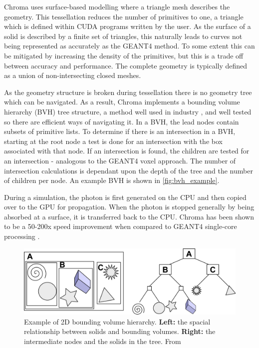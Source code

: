 Chroma uses surface-based modelling where a triangle mesh describes the geometry.
This tessellation reduces the number of primitives to one, a triangle which is defined within CUDA programs written by the user.
As the surface of a solid is described by a finite set of triangles, this naturally leads to curves not being represented as accurately as the GEANT4 method.
To some extent this can be mitigated by increasing the density of the primitives, but this is a trade off between accuracy and performance.
The complete geometry is typically defined as a union of non-intersecting closed meshes.
\par
As the geometry structure is broken during tessellation there is no geometry tree which can be navigated.
As a result, Chroma implements a bounding volume hierarchy (BVH) tree structure, a method well used in industry \cite{real_time_collision_detection_ref}, and well tested so there are efficient ways of navigating it.
In a BVH, the lead nodes contain subsets of primitive lists.
To determine if there is an intersection in a BVH, starting at the root node a test is done for an intersection with the box associated with that node.
If an intersection is found, the children are tested for an intersection - analogous to the GEANT4 voxel approach.
The number of intersection calculations is dependant upon the depth of the tree and the number of children per node.
An example BVH is shown in \autoref{fig:bvh_example}.
\par
During a simulation, the photon is first generated on the CPU and then copied over to the GPU for propagation.
When the photon is stopped generally by being absorbed at a surface, it is transferred back to the CPU.
Chroma has been shown to be a 50-200x speed improvement when compared to GEANT4 single-core processing \cite{chroma_whitepaper_ref,chroma_presentation_ref}.
\begin{figure}
    \centering
    \includegraphics[width=\textwidth]{Figures/Simulations/bounding_volume_hierarchy.png}
    \caption{Example of 2D bounding volume hierarchy. 
             \textbf{Left:} the spacial relationship between solids and bounding volumes.
             \textbf{Right:} the intermediate nodes and the solids in the tree.
             From \cite{bounding_box_ref}}
    \label{fig:bvh_example}
\end{figure}
